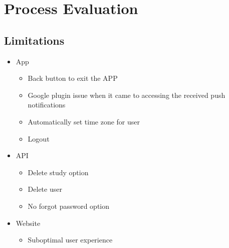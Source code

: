 \documentclass[12pt, a4paper]{report}
\begin{document}
\chapter{Process Evaluation}
\section{Limitations} 
\begin{itemize}
    \item  App
    \begin {itemize}
    \item Back button to exit the APP
    \item Google plugin issue when it came to accessing the received push notifications
    \item Automatically set time zone for user
    \item Logout
    \end{itemize}
    \item API
    \begin{itemize}
        \item Delete study option
        \item Delete user
        \item No forgot password option
    \end{itemize}
    \item Website
    \begin{itemize}
        \item Suboptimal user experience 
    \end{itemize}
\end{itemize}
\newpage
\end{document}
